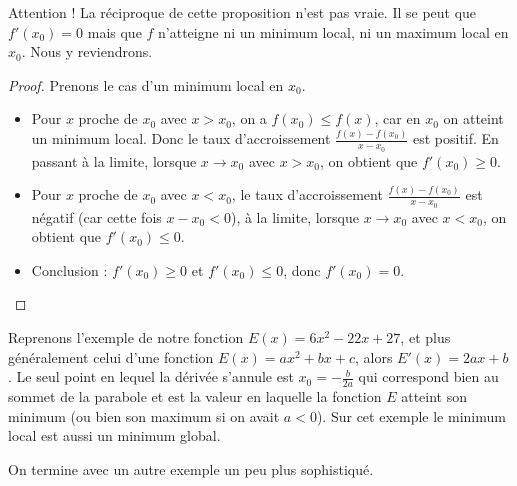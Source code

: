 \documentclass[11pt,class=report,crop=false]{standalone}
\begin{document}
Attention ! La réciproque de cette proposition n'est pas vraie. Il se peut que $f'(x_0)=0$ mais que $f$ n'atteigne ni un minimum local, ni un maximum local en $x_0$. Nous y reviendrons.

\begin{proof}
Prenons le cas d'un minimum local en $x_0$.
\begin{itemize}
  \item Pour $x$ proche de $x_0$ avec $x>x_0$, on a $f(x_0) \le f(x)$, car en $x_0$ on atteint un minimum local. Donc le taux d'accroissement $\frac{f(x)-f(x_0)}{x-x_0}$ est positif. En passant à la limite, lorsque $x \to x_0$ avec $x>x_0$, on obtient que $f'(x_0) \ge 0$.
  \item Pour $x$ proche de $x_0$ avec $x<x_0$, le taux d'accroissement $\frac{f(x)-f(x_0)}{x-x_0}$ est négatif (car cette fois $x-x_0<0$), à la limite, 
 lorsque $x \to x_0$ avec $x<x_0$, on obtient que $f'(x_0) \le 0$.
 \item Conclusion : $f'(x_0) \ge 0$ et $f'(x_0) \le 0$, donc $f'(x_0)=0$.
\end{itemize}
\end{proof}


Reprenons l'exemple de notre fonction $E(x) = 6x^2-22x+27$, et plus généralement celui d'une fonction $E(x) = ax^2+bx+c$, alors $E'(x)=2ax+b$. Le seul point en lequel la dérivée s'annule est $x_0 = -\frac{b}{2a}$ qui correspond bien au sommet de la parabole et est la valeur en laquelle la fonction $E$ atteint son minimum (ou bien son maximum si on avait $a<0$). Sur cet exemple le minimum local est aussi un minimum global.

On termine avec un autre exemple un peu plus sophistiqué.
\end{document}
